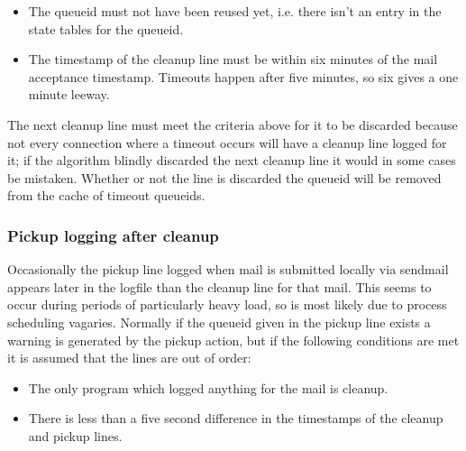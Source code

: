 \documentclass[a4paper,12pt,draft]{article}
\begin{document}
\begin{enumerate}
        \begin{itemize}

            \item The queueid must not have been reused yet, i.e. there
                isn't an entry in the state tables for the queueid.

            \item The timestamp of the cleanup line must be within six
                minutes of the mail acceptance timestamp.  Timeouts happen
                after five minutes, so six gives a one minute leeway.

        \end{itemize}

        The next cleanup line must meet the criteria above for it to be
        discarded because not every connection where a timeout occurs will
        have a cleanup line logged for it; if the algorithm blindly
        discarded the next cleanup line it would in some cases be mistaken.
        Whether or not the line is discarded the queueid will be removed
        from the cache of timeout queueids.

\end{enumerate}

\subsubsection{Pickup logging after cleanup}

\label{pickup-logging-after-cleanup}

Occasionally the pickup line logged when mail is submitted locally via
sendmail appears later in the logfile than the cleanup line for that mail.
This seems to occur during periods of particularly heavy load, so is most
likely due to process scheduling vagaries.  Normally if the queueid given
in the pickup line exists a warning is generated by the pickup action, but
if the following conditions are met it is assumed that the lines are out of
order:

\begin{itemize}

    \item The only program which logged anything for the mail is cleanup.

    \item There is less than a five second difference in the timestamps of
        the cleanup and pickup lines.

\end{itemize}
\end{document}
